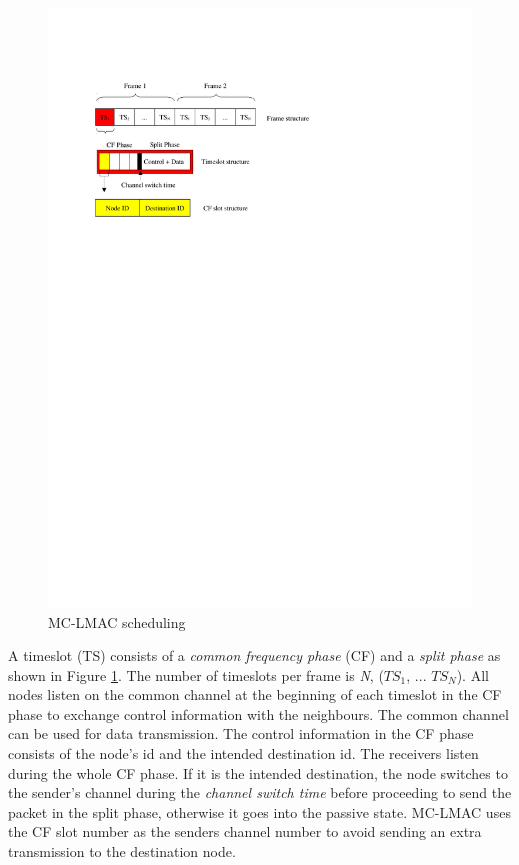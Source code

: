 \begin{figure}
\centering
\includegraphics[trim=2cm 19cm 8cm 3cm, clip=true, totalheight=0.35\textheight]{mclmac.pdf}
\caption{MC-LMAC scheduling}
\label{fig_mclmac}
\end{figure}

A timeslot (TS) consists of a \textit{common frequency phase} (CF) and a \textit{split phase} as shown in Figure \ref{fig_mclmac}. The number of timeslots per frame is \textit{N}, ($TS_1$, ... $TS_N$). All nodes listen on the common channel at the beginning of each timeslot in the CF phase to exchange control information with the neighbours. The common channel can be used for data transmission. The control information in the CF phase consists of the node's id and the intended destination id. The receivers listen during the whole CF phase. If it is the intended destination, the node switches to the sender's channel during the \textit{channel switch time} before proceeding to send the packet in the split phase, otherwise it goes into the passive state. MC-LMAC uses the CF slot number as the senders channel number to avoid sending an extra transmission to the destination node.

